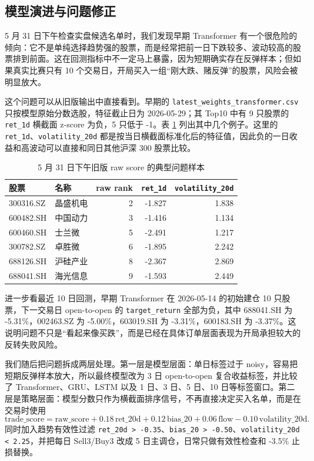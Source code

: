 \documentclass[fontset=mac]{ctexart}
\begin{document}
\subsection{模型演进与问题修正}

5 月 31 日下午检查实盘候选名单时，我们发现早期 Transformer 有一个很危险的倾向：它不是单纯选择趋势强的股票，而是经常把前一日下跌较多、波动较高的股票排到前面。这在回测指标中不一定马上暴露，因为短期确实存在反弹样本；但如果真实比赛只有 10 个交易日，开局买入一组“刚大跌、赌反弹”的股票，风险会被明显放大。

这个问题可以从旧版输出中直接看到。早期的 \verb|latest_weights_transformer.csv| 只按模型原始分数选股，特征截止日为 2026-05-29；其 Top10 中有 9 只股票的 \verb|ret_1d| 横截面 z-score 为负，5 只低于 -1。表 \ref{tab:raw-drop-cases} 列出其中几个例子。这里的 \verb|ret_1d|、\verb|volatility_20d| 都是按当日横截面标准化后的特征值，因此负的一日收益和高波动可以直接和同日其他沪深 300 股票比较。

\begin{table}[htbp]
\centering
\caption{5 月 31 日下午旧版 raw score 的典型问题样本}
\label{tab:raw-drop-cases}
\begin{tabular}{llrrr}
\toprule
股票 & 名称 & raw rank & \texttt{ret\_1d} & \texttt{volatility\_20d} \\
\midrule
300316.SZ & 晶盛机电 & 2 & -1.827 & 1.838 \\
600482.SH & 中国动力 & 3 & -1.416 & 1.134 \\
600460.SH & 士兰微 & 5 & -2.491 & 1.217 \\
300782.SZ & 卓胜微 & 6 & -1.895 & 2.242 \\
688126.SH & 沪硅产业 & 8 & -2.367 & 2.869 \\
688041.SH & 海光信息 & 9 & -1.593 & 2.449 \\
\bottomrule
\end{tabular}
\end{table}

进一步看最近 10 日回测，早期 Transformer 在 2026-05-14 的初始建仓 10 只股票，下一交易日 open-to-open 的 \verb|target_return| 全部为负，其中 688041.SH 为 -5.31\%，002463.SZ 为 -5.00\%，603019.SH 为 -3.31\%，600183.SH 为 -3.37\%。这说明问题不只是“看起来像买跌”，而是已经在具体订单层面表现为开局承担较大的反转失败风险。

我们随后把问题拆成两层处理。第一层是模型层面：单日标签过于 noisy，容易把短期反弹样本放大，所以最终模型改为 3 日 open-to-open 复合收益标签，并比较了 Transformer、GRU、LSTM 以及 1 日、3 日、5 日、10 日等标签窗口。第二层是策略层面：模型分数只作为横截面排序信号，不再直接决定买入名单，而是在交易时使用
\[
\mathrm{trade\_score}
= \mathrm{raw\_score}
+0.18\,\mathrm{ret\_20d}
+0.12\,\mathrm{bias\_20}
+0.06\,\mathrm{flow}
-0.10\,\mathrm{volatility\_20d}.
\]
同时加入趋势有效性过滤 \verb|ret_20d > -0.35|、\verb|bias_20 > -0.50|、\verb|volatility_20d < 2.25|，并把每日 Sell3/Buy3 改成 5 日主调仓，日常只做有效性检查和 -3.5\% 止损替换。
\end{document}
